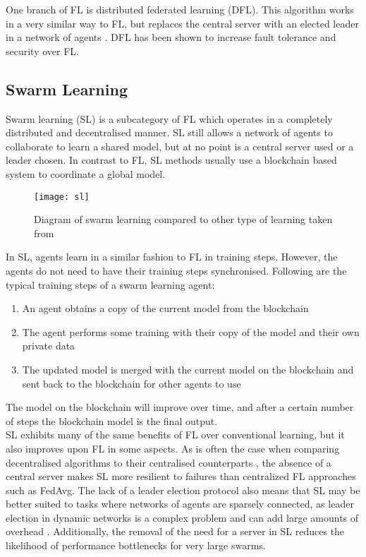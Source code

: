 One branch of FL is distributed federated learning (DFL). This algorithm works in a very similar way to FL, but replaces the central server with an elected leader in a network of agents \cite{leaderelec_car}. DFL has been shown to increase fault tolerance and security over FL.


\subsection{Swarm Learning}
Swarm learning (SL) \cite{swarm_learning} is a subcategory of FL which operates in a completely distributed and decentralised manner. SL still allows a network of agents to collaborate to learn a shared model, but at no point is a central server used or a leader chosen. In contrast to FL, SL methods usually use a blockchain based system to coordinate a global model.

\begin{figure}[h]
	\texttt{[image: sl]}
	\caption{Diagram of swarm learning compared to other type of learning taken from \cite{swarm_learning}}
	\label{fig_learning}
\end{figure}


In SL, agents learn in a similar fashion to FL in training steps. However, the agents do not need to have their training steps synchronised. Following are the typical training steps of a swarm learning agent:
\begin{enumerate}
	\item An agent obtains a copy of the current model from the blockchain
	\item The agent performs some training with their copy of the model and their own private data
	\item The updated model is merged with the current model on the blockchain and sent back to the blockchain for other agents to use
\end{enumerate}
The model on the blockchain will improve over time, and after a certain number of steps the blockchain model is the final output. \\

SL exhibits many of the same benefits of FL over conventional learning, but it also improves upon FL in some aspects. As is often the case when comparing decentralised algorithms to their centralised counterparts \cite{swarm_resil}, the absence of a central server makes SL more resilient to failures than centralized FL approaches such as FedAvg. The lack of a leader election protocol also means that SL may be better suited to tasks where networks of agents are sparsely connected, as leader election in dynamic networks is a complex problem and can add large amounts of overhead \cite{leaderelection}. Additionally, the removal of the need for a server in SL reduces the likelihood of performance bottlenecks for very large swarms.

